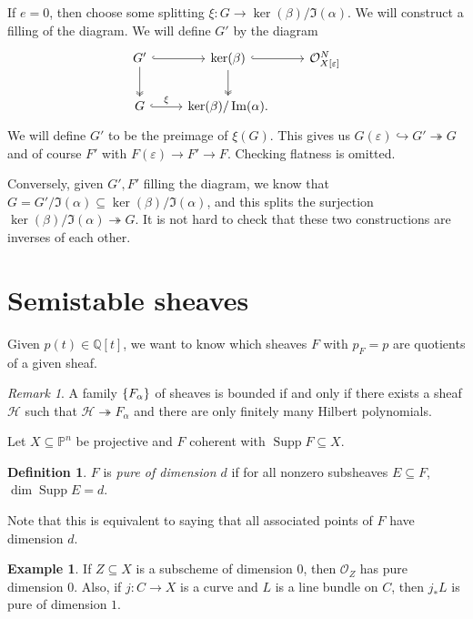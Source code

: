 \documentclass[leqno, openany]{memoir}
\theoremstyle{definition}
\newtheorem{defn}[thm]{Definition}
\newtheorem{exm}[thm]{Example}
\theoremstyle{remark}
\newtheorem{rmk}[thm]{Remark}
\theoremstyle{plain}
\theoremstyle{definition}
\theoremstyle{remark}
\newcommand{\Q}{\mathbb{Q}}
\renewcommand{\P}{\mathbb{P}}
\newcommand{\ep}{\varepsilon}
\newcommand{\mc}[1]{\mathcal{#1}}
\DeclareMathOperator{\Supp}{Supp}
\begin{document}
If $e = 0$, then choose some splitting $\xi \colon G \to \ker(\beta) / \Im(\alpha)$. We will construct a filling of the diagram. We will define $G'$ by the diagram
\begin{equation*}
\begin{tikzcd}
    G' \ar[hookrightarrow]{r} \ar[twoheadrightarrow]{d} & \ker(\beta) \ar[hookrightarrow]{r} \ar[twoheadrightarrow]{d} & \mc{O}_{X[\ep]}^N \\
    G \ar[hookrightarrow]{r}{\xi} & \ker(\beta) / \Im(\alpha).
\end{tikzcd}
\end{equation*}
We will define $G'$ to be the preimage of $\xi(G)$. This gives us $G(\ep) \hookrightarrow G' \twoheadrightarrow G$ and of course $F'$ with $F(\ep) \to F' \to F$. Checking flatness is omitted.

Conversely, given $G', F'$ filling the diagram, we know that $G = G' / \Im(\alpha) \subseteq \ker(\beta)/\Im(\alpha)$, and this splits the surjection $\ker(\beta) / \Im(\alpha) \twoheadrightarrow G$. It is not hard to check that these two constructions are inverses of each other.

\section{Semistable sheaves}%
\label{sec:semistable_sheaves}

Given $p(t) \in \Q[t]$, we want to know which sheaves $F$ with $p_F = p$ are quotients of a given sheaf.
\begin{rmk}
    A family $\qty{F_{\alpha}}$ of sheaves is bounded if and only if there exists a sheaf $\mc{H}$ such that $\mc{H} \twoheadrightarrow F_{\alpha}$ and there are only finitely many Hilbert polynomials.
\end{rmk}

Let $X \subseteq \P^n$ be projective and $F$ coherent with $\Supp F \subseteq X$.
\begin{defn}
    $F$ is \textit{pure of dimension $d$} if for all nonzero subsheaves $E \subseteq F$, $\dim \Supp E = d$.
\end{defn}
Note that this is equivalent to saying that all associated points of $F$ have dimension $d$.

\begin{exm}
    If $Z \subseteq X$ is a subscheme of dimension $0$, then $\mc{O}_Z$ has pure dimension $0$. Also, if $j \colon C \to X$ is a curve and $L$ is a line bundle on $C$, then $j_* L$ is pure of dimension $1$.
\end{exm}
\end{document}
